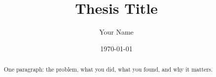 \documentclass[11pt,a4paper]{report}
\title{Thesis Title}
\author{Your Name}
\date{\today}
\begin{document}
\maketitle

\begin{abstract}
One paragraph: the problem, what you did, what you found, and why it matters.
\end{abstract}

\tableofcontents







\end{document}
